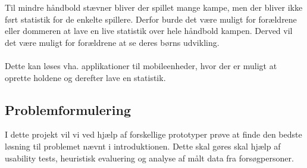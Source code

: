 Til mindre håndbold stævner bliver der spillet mange kampe, men der bliver ikke ført statistik for de enkelte spillere. Derfor burde det være muligt for forældrene eller dommeren at lave en live statistik over hele håndbold kampen. Derved vil det være muligt for forældrene at se deres børns udvikling.\\\\
Dette kan løses vha. applikationer til mobileenheder, hvor der er muligt at oprette holdene og derefter lave en statistik. 

\subsection*{Problemformulering}
I dette projekt vil vi ved hjælp af forskellige prototyper prøve at finde den bedste løsning til problemet nævnt i introduktionen. Dette skal gøres skal hjælp af usability tests, heuristisk evaluering og analyse af målt data fra forsøgpersoner.

